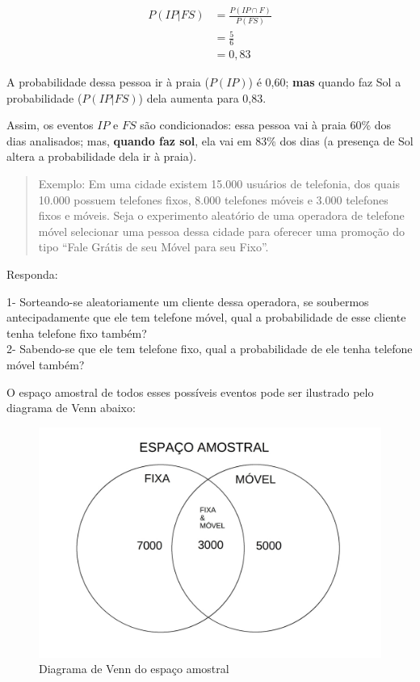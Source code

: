 \documentclass[
]{book}
\begin{document}
\hfill\break

\begin{align*}
P(IP|FS) & = \frac{ P(IP \cap F)}{ P(FS)} \\
       & = \frac{5}{6} \\
       & = 0,83     
\end{align*}

\hfill\break

A probabilidade dessa pessoa ir à praia (\(P(IP)\)) é 0,60; \textbf{mas} quando faz Sol a probabilidade (\(P(IP|FS)\)) dela aumenta para 0,83.

\hfill\break

Assim, os eventos \(IP\) e \(FS\) são condicionados: essa pessoa vai à praia 60\% dos dias analisados; mas, \textbf{quando faz sol}, ela vai em 83\% dos dias (a presença de Sol altera a probabilidade dela ir à praia).

\hfill\break

\begin{quote}
Exemplo: Em uma cidade existem 15.000 usuários de telefonia, dos quais 10.000 possuem telefones fixos, 8.000 telefones móveis e 3.000 telefones fixos e móveis. Seja o experimento aleatório de uma operadora de telefone móvel selecionar uma pessoa dessa cidade para oferecer uma promoção do tipo ``Fale Grátis de seu Móvel para seu Fixo''.
\end{quote}

\hfill\break

Responda:

\hfill\break

1- Sorteando-se aleatoriamente um cliente dessa operadora, se soubermos antecipadamente que ele tem telefone móvel, qual a probabilidade de esse cliente tenha telefone fixo também?\\
2- Sabendo-se que ele tem telefone fixo, qual a probabilidade de ele tenha telefone móvel também?

\hfill\break

O espaço amostral de todos esses possíveis eventos pode ser ilustrado pelo diagrama de Venn abaixo:

\hfill\break

\begin{figure}

{\centering \includegraphics[width=0.5\linewidth]{images4/exercicio} 

}

\caption{Diagrama de Venn do espaço amostral}\label{fig:venn}
\end{figure}
\end{document}
